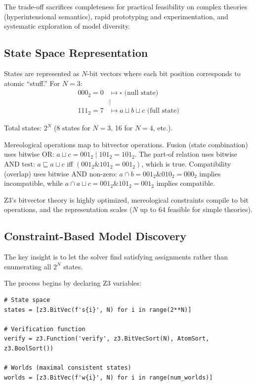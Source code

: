 \documentclass[pdflatex,sn-mathphys-num]{sn-jnl}
\newcommand{\nullstate}{\square}            %
\newcommand{\fuse}[2]{#1 \sqcup #2}         %
\newcommand{\parthood}{\sqsubseteq}         %
\theoremstyle{thmstyleone}
\theoremstyle{thmstyletwo}
\theoremstyle{thmstylethree}
\begin{document}
The trade-off sacrifices completeness for practical feasibility on complex theories (hyperintensional semantics), rapid prototyping and experimentation, and systematic exploration of model diversity.

\subsection{State Space Representation}\label{sec:state-space}

States are represented as $N$-bit vectors where each bit position corresponds to atomic ``stuff.''
For $N=3$:
\begin{align*}
000_2 = 0 &\mapsto \nullstate \text{ (null state)} \\
&\vdots \\
111_2 = 7 &\mapsto \fuse{a}{\fuse{b}{c}} \text{ (full state)}
\end{align*}

Total states: $2^N$ (8 states for $N=3$, 16 for $N=4$, etc.).

Mereological operations map to bitvector operations.
Fusion (state combination) uses bitwise OR: $\fuse{a}{c} = 001_2 \mathbin{|} 101_2 = 101_2$.
The part-of relation uses bitwise AND test: $a \parthood \fuse{a}{c}$ iff $(001_2 \mathbin{\&} 101_2 = 001_2)$, which is true.
Compatibility (overlap) uses bitwise AND non-zero: $a \cap b = 001_2 \mathbin{\&} 010_2 = 000_2$ implies incompatible, while $a \cap \fuse{a}{c} = 001_2 \mathbin{\&} 101_2 = 001_2$ implies compatible.

Z3's bitvector theory is highly optimized, mereological constraints compile to bit operations, and the representation scales ($N$ up to 64 feasible for simple theories).

\subsection{Constraint-Based Model Discovery}\label{sec:constraint-discovery}

The key insight is to let the solver find satisfying assignments rather than enumerating all $2^N$ states.

The process begins by declaring Z3 variables:
\begin{lstlisting}[caption={Z3 variable declarations}]
# State space
states = [z3.BitVec(f's{i}', N) for i in range(2**N)]

# Verification function
verify = z3.Function('verify', z3.BitVecSort(N), AtomSort, z3.BoolSort())

# Worlds (maximal consistent states)
worlds = [z3.BitVec(f'w{i}', N) for i in range(num_worlds)]
\end{lstlisting}
\end{document}
